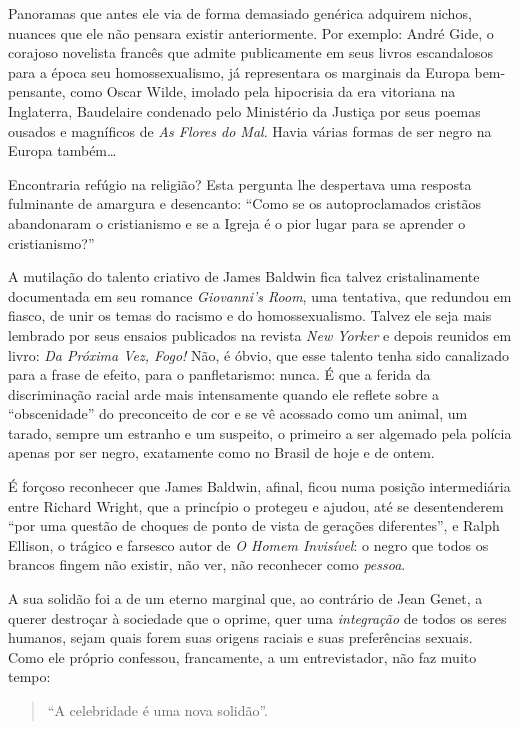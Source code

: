 \documentclass[
  letterpaper,
  DIV=11,
  numbers=noendperiod]{scrreprt}
\begin{document}
Panoramas que antes ele via de forma demasiado genérica adquirem nichos,
nuances que ele não pensara existir anteriormente. Por exemplo: André
Gide, o corajoso novelista francês que admite publicamente em seus
livros escandalosos para a época seu homossexualismo, já representara os
marginais da Europa bem-pensante, como Oscar Wilde, imolado pela
hipocrisia da era vitoriana na Inglaterra, Baudelaire condenado pelo
Ministério da Justiça por seus poemas ousados e magníficos de \emph{As
Flores do Mal}. Havia várias formas de ser negro na Europa
também\ldots{}

Encontraria refúgio na religião? Esta pergunta lhe despertava uma
resposta fulminante de amargura e desencanto: ``Como se os
autoproclamados cristãos abandonaram o cristianismo e se a Igreja é o
pior lugar para se aprender o cristianismo?''

A mutilação do talento criativo de James Baldwin fica talvez
cristalinamente documentada em seu romance \emph{Giovanni's Room}, uma
tentativa, que redundou em fiasco, de unir os temas do racismo e do
homossexualismo. Talvez ele seja mais lembrado por seus ensaios
publicados na revista \emph{New Yorker} e depois reunidos em livro:
\emph{Da Próxima Vez, Fogo!} Não, é óbvio, que esse talento tenha sido
canalizado para a frase de efeito, para o panfletarismo: nunca. É que a
ferida da discriminação racial arde mais intensamente quando ele reflete
sobre a ``obscenidade'' do preconceito de cor e se vê acossado como um
animal, um tarado, sempre um estranho e um suspeito, o primeiro a ser
algemado pela polícia apenas por ser negro, exatamente como no Brasil de
hoje e de ontem.

É forçoso reconhecer que James Baldwin, afinal, ficou numa posição
intermediária entre Richard Wright, que a princípio o protegeu e ajudou,
até se desentenderem ``por uma questão de choques de ponto de vista de
gerações diferentes'', e Ralph Ellison, o trágico e farsesco autor de
\emph{O Homem Invisível}: o negro que todos os brancos fingem não
existir, não ver, não reconhecer como \emph{pessoa}.

A sua solidão foi a de um eterno marginal que, ao contrário de Jean
Genet, a querer destroçar à sociedade que o oprime, quer uma
\emph{integração} de todos os seres humanos, sejam quais forem suas
origens raciais e suas preferências sexuais. Como ele próprio confessou,
francamente, a um entrevistador, não faz muito tempo:

\begin{quote}
``A celebridade é uma nova solidão''.
\end{quote}
\end{document}
